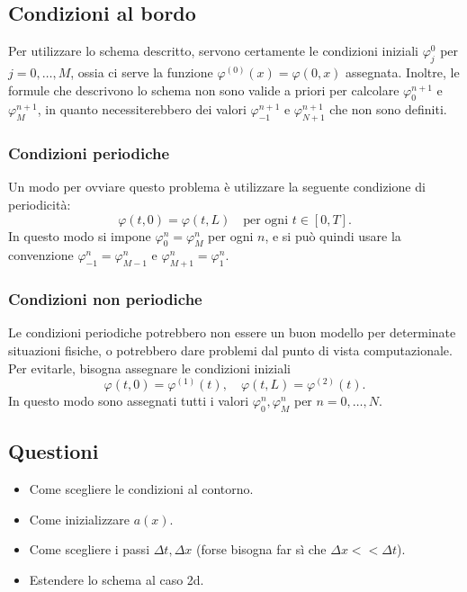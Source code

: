 \documentclass [11pt]{article}
\renewcommand{\phi}{\varphi}
\theoremstyle{definition}
\theoremstyle{definition}
\newcommand{ \ssss }[1]{\subsubsection*{#1}}
\newcommand{ \sss }[1]{\subsection*{#1}}
\begin{document}
\sss{Condizioni al bordo}



Per utilizzare lo schema descritto, servono certamente le condizioni iniziali $\phi_j^0$ per $j=0,\dots, M$, ossia ci serve la funzione $\phi^{(0)}(x)=\phi(0,x)$ assegnata. Inoltre, le formule che descrivono lo schema non sono valide a priori per calcolare $\phi^{n+1}_0$ e $\phi^{n+1}_{M}$, in quanto necessiterebbero dei valori $\phi^{n+1}_{-1}$ e $\phi^{n+1}_{N+1}$ che non sono definiti.

\ssss{Condizioni periodiche }

Un modo per ovviare questo problema è utilizzare la seguente condizione di periodicità:
%
$$
\phi(t,0)=\phi(t,L)\quad \text{per ogni $t\in[0,T]$}.
$$
%
In questo modo si impone $\phi_0^n=\phi_M^n$ per ogni $n$, e si può quindi usare la convenzione $\phi^n_{-1}=\phi^n_{M-1}$ e $\phi^n_{M+1}=\phi^n_1$.


\ssss{Condizioni non periodiche}
Le condizioni periodiche potrebbero non essere un buon modello per determinate situazioni fisiche, o potrebbero dare problemi dal punto di vista computazionale. Per evitarle, bisogna assegnare le condizioni iniziali
%
$$
\phi(t,0)=\phi^{(1)}(t),\quad \phi(t,L)=\phi^{(2)}(t).
$$
In questo modo sono assegnati tutti i valori $\phi^n_0, \phi^n_M$ per $n=0,\dots,N$.
%



\sss{Questioni}


\begin{itemize}
	\item Come scegliere le condizioni al contorno.
	\item Come inizializzare $a(x)$.
	\item Come scegliere i passi $\Delta t, \Delta x$ (forse bisogna far sì che $\Delta x<<\Delta t$).
	\item Estendere lo schema al caso 2d.
\end{itemize}





		
\end{document}
